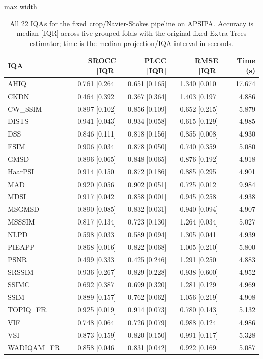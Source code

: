 \documentclass[final,3p,times,twocolumn]{elsarticle}
\begin{document}
\begin{table}[t!]
    \centering
    \caption{All 22 IQAs for the fixed crop/Navier-Stokes pipeline on APSIPA. Accuracy is median [IQR] across five grouped folds with the original fixed Extra Trees estimator; time is the median projection/IQA interval in seconds.}
    \label{tab_review_projection_iqas}
    \scriptsize
    \begin{adjustbox}{max width=\textwidth}
        \begin{tabular}{lrrrr}
        \toprule
        IQA & SROCC [IQR] & PLCC [IQR] & RMSE [IQR] & Time (s) \\
        \midrule
        AHIQ & 0.761 [0.264] & 0.651 [0.165] & 1.340 [0.010] & 17.674 \\
        CKDN & 0.464 [0.392] & 0.367 [0.364] & 1.403 [0.197] & 4.886 \\
        CW\_SSIM & 0.897 [0.102] & 0.856 [0.109] & 0.652 [0.215] & 5.879 \\
        DISTS & 0.941 [0.043] & 0.934 [0.058] & 0.615 [0.129] & 4.985 \\
        DSS & 0.846 [0.111] & 0.818 [0.156] & 0.855 [0.008] & 4.930 \\
        FSIM & 0.906 [0.034] & 0.878 [0.050] & 0.740 [0.359] & 5.080 \\
        GMSD & 0.896 [0.065] & 0.848 [0.065] & 0.876 [0.192] & 4.918 \\
        HaarPSI & 0.914 [0.150] & 0.872 [0.186] & 0.885 [0.295] & 4.901 \\
        MAD & 0.920 [0.056] & 0.902 [0.051] & 0.725 [0.012] & 9.984 \\
        MDSI & 0.917 [0.042] & 0.858 [0.001] & 0.945 [0.258] & 4.938 \\
        MSGMSD & 0.890 [0.085] & 0.832 [0.031] & 0.940 [0.094] & 4.907 \\
        MSSSIM & 0.817 [0.134] & 0.723 [0.130] & 1.264 [0.034] & 5.027 \\
        NLPD & 0.598 [0.033] & 0.589 [0.094] & 1.305 [0.041] & 4.939 \\
        PIEAPP & 0.868 [0.016] & 0.822 [0.068] & 1.005 [0.210] & 5.800 \\
        PSNR & 0.499 [0.333] & 0.425 [0.246] & 1.291 [0.250] & 4.883 \\
        SRSSIM & 0.936 [0.267] & 0.829 [0.228] & 0.938 [0.600] & 4.952 \\
        SSIMC & 0.692 [0.387] & 0.699 [0.320] & 1.281 [0.129] & 4.969 \\
        SSIM & 0.889 [0.157] & 0.762 [0.062] & 1.056 [0.219] & 4.908 \\
        TOPIQ\_FR & 0.925 [0.019] & 0.914 [0.073] & 0.780 [0.143] & 5.132 \\
        VIF & 0.748 [0.064] & 0.726 [0.079] & 0.988 [0.124] & 4.986 \\
        VSI & 0.873 [0.159] & 0.820 [0.150] & 0.991 [0.117] & 5.328 \\
        WADIQAM\_FR & 0.858 [0.046] & 0.831 [0.042] & 0.922 [0.169] & 5.087 \\
        \bottomrule
        \end{tabular}
    \end{adjustbox}
\end{table}
\end{document}
